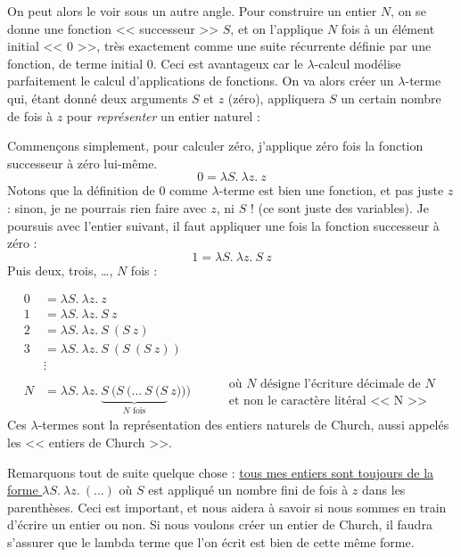 \documentclass[11pt]{article}
\begin{document}
On peut alors le voir sous un autre angle. Pour construire un entier $N$, on se donne une fonction << successeur >> $S$, et on l'applique $N$ fois à un élément initial << 0 >>, très exactement comme une suite récurrente définie par une fonction, de terme initial 0. Ceci est avantageux car le $\lambda$-calcul modélise parfaitement le calcul d'applications de fonctions. On va alors créer un $\lambda$-terme qui, étant donné deux arguments $S$ et $z$ (zéro), appliquera $S$ un certain nombre de fois à $z$ pour \textit{représenter} un entier naturel :

Commençons simplement, pour calculer zéro, j'applique zéro fois la fonction successeur à zéro lui-même.
$$0=\lambda S.~\lambda z.~z$$
Notons que la définition de 0 comme $\lambda$-terme est bien une fonction, et pas juste $z$ : sinon, je ne pourrais rien faire avec $z$, ni $S$ ! (ce sont juste des variables).
Je poursuis avec l'entier suivant, il faut appliquer une fois la fonction successeur à zéro :
$$1=\lambda S.~\lambda z.~S~z$$
Puis deux, trois, \dots, $N$ fois :
\begin{definition}
    \begin{equation*}
    \begin{aligned}
        0 &= \lambda S.~\lambda z.~z\\
        1 &= \lambda S.~\lambda z.~S~z\\
        2 &= \lambda S.~\lambda z.~S~(S~z)\\
        3 &= \lambda S.~\lambda z.~S~(S~(S~z))\\
        &\vdots\\
        \boxed{N}&=\lambda S.~\lambda z.~\underbrace{S~(S~(\dots~S~(S}_\text{$N$ fois}~z)))~~~~~~~~~~~~\substack{\text{où $\boxed{N}$ désigne l'écriture décimale de $N$}\\\text{et non le caractère litéral << N >>}}
    \end{aligned}
    \end{equation*}
    Ces $\lambda$-termes sont la représentation des entiers naturels de Church, aussi appelés les << entiers de Church >>.
\end{definition}

Remarquons tout de suite quelque chose : \underline{tous mes entiers sont toujours de la forme $\lambda S.~\lambda z.~ (\dots)$} où $S$ est appliqué un nombre fini de fois à $z$ dans les parenthèses. Ceci est important, et nous aidera à savoir si nous sommes en train d'écrire un entier ou non. Si nous voulons créer un entier de Church, il faudra s'assurer que le lambda terme que l'on écrit est bien de cette même forme.
\end{document}
